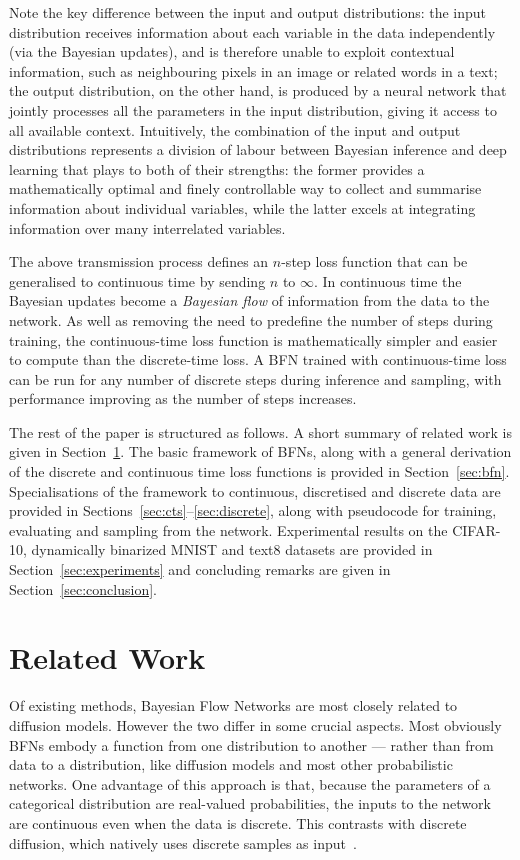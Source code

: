\documentclass[11pt,table]{article}
\newcommand{\0}[1]{\constvec{0}{#1}}
\newcommand{\1}[1]{\constvec{1}{#1}}
\begin{document}
Note the key difference between the input and output distributions: the input distribution receives information about each variable in the data independently (via the Bayesian updates), and is therefore unable to exploit contextual information, such as neighbouring pixels in an image or related words in a text; the output distribution, on the other hand, is produced by a neural network that jointly processes all the parameters in the input distribution, giving it access to all available context.
Intuitively, the combination of the input and output distributions represents a division of labour between Bayesian inference and deep learning that plays to both of their strengths: the former provides a mathematically optimal and finely controllable way to collect and summarise information about individual variables, while the latter excels at integrating information over many interrelated variables.

The above transmission process defines an $n$-step loss function that can be generalised to continuous time by sending $n$ to $\infty$.
In continuous time the Bayesian updates become a \emph{Bayesian flow} of information from the data to the network.
As well as removing the need to predefine the number of steps during training, the continuous-time loss function is mathematically simpler and easier to compute than the discrete-time loss.
A BFN trained with continuous-time loss can be run for any number of discrete steps during inference and sampling, with performance improving as the number of steps increases.

The rest of the paper is structured as follows. 
A short summary of related work is given in Section~\ref{sec:related}.
The basic framework of BFNs, along with a general derivation of the discrete and continuous time loss functions is provided in Section~\ref{sec:bfn}.
Specialisations of the framework to continuous, discretised and discrete data are provided in Sections~\ref{sec:cts}--\ref{sec:discrete}, along with pseudocode for training, evaluating and sampling from the network.
Experimental results on the CIFAR-10, dynamically binarized MNIST and text8 datasets are provided in Section~\ref{sec:experiments} and concluding remarks are given in Section~\ref{sec:conclusion}.

\section{Related Work}\label{sec:related}
Of existing methods, Bayesian Flow Networks are most closely related to diffusion models.
However the two differ in some crucial aspects.
Most obviously BFNs embody a function from one distribution to another --- rather than from data to a distribution, like diffusion models and most other probabilistic networks. 
One advantage of this approach is that, because the parameters of a categorical distribution are real-valued probabilities, the inputs to the network are continuous even when the data is discrete. 
This contrasts with discrete diffusion, which natively uses discrete samples as input~\citep{sohl2015deep,hoogeboom2021,austin2021d3pm}.
\end{document}
